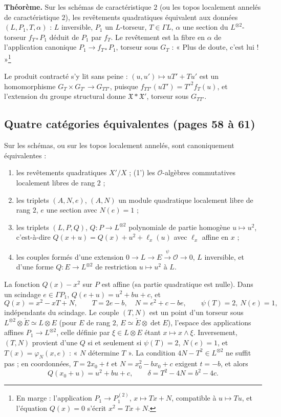 \documentclass[11pt,a4paper]{article}
\begin{document}
\textbf{Théorème.} Sur les schémas de caractéristique $2$ (ou les topos localement
annelés de caractéristique $2$), les revêtements quadratiques équivalent aux
données $(L, P_1, T, \alpha)$ : $L$ inversible, $P_1$ un $L$-torseur, $T \in \Gamma L$,
$\alpha$ une section du $L^{\otimes 2}$-torseur $f_{T*}P_1$ déduit de $P_1$ par $f_T$.
Le revêtement est la fibre en $\alpha$ de l'application canonique
$P_1 \to f_{T*}P_1$, torseur sous $G_T$ : « Plus de doute, c'est lui ! »\footnote{En
marge : l'application $P_1 \to P_1^{(2)}$, $x \mapsto Tx + N$, compatible à $u \mapsto
Tu$, et l'équation $Q(x) = 0$ s'écrit $x^{2} = Tx + N$.}

Le produit contracté s'y lit sans peine : $(u, u') \mapsto uT' + Tu'$ est un
homomorphisme $G_T \times G_{T'} \to G_{TT'}$, puisque $f_{TT'}(uT') = T'^{2}f_T(u)$, et
l'extension du groupe structural donne $\mathfrak{X} * \mathfrak{X}'$, torseur sous
$G_{TT'}$.

\subsection*{Quatre catégories équivalentes (pages 58 à 61)}

Sur les schémas, ou sur les topos localement annelés, sont canoniquement
équivalentes :
\begin{enumerate}
\item[(1)] les revêtements quadratiques $X'/X$ ; (1') les $\mathcal{O}$-algèbres
commutatives localement libres de rang $2$ ;
\item[(2)] les triplets $(A, N, e)$, $(A, N)$ un module quadratique localement libre de
rang $2$, $e$ une section avec $N(e) = 1$ ;
\item[(3)] les triplets $(L, P, Q)$, $Q : P \to L^{\otimes 2}$ polynomiale de partie
homogène $u \mapsto u^{2}$, c'est-à-dire $Q(x + u) = Q(x) + u^{2} + \ell_x(u)$ avec
$\ell_x$ affine en $x$ ;
\item[(3')] les couples formés d'une extension $0 \to L \to E \xrightarrow{\psi}
\mathcal{O} \to 0$, $L$ inversible, et d'une forme $Q : E \to L^{\otimes 2}$ de
restriction $u \mapsto u^{2}$ à $L$.
\end{enumerate}
La fonction $Q(x) - x^{2}$ sur $P$ est affine (sa partie quadratique est nulle).
Dans un scindage $e \in \Gamma P_1$, $Q(e + u) = u^{2} + bu + c$, et
\[
  Q(x) = x^{2} - xT + N, \qquad \boxed{T = 2e - b, \quad N = e^{2} + c - be}, \qquad \psi(T) = 2,\ N(e) = 1,
\]
indépendants du scindage. Le couple $(T, N)$ est un point d'un torseur sous
$L^{\otimes 2} \otimes \check{E} \simeq L \otimes E$ (pour $E$ de rang $2$,
$E \simeq \check{E} \otimes \det E$), l'espace des applications affines $P_1 \to
L^{\otimes 2}$, celle définie par $\xi \in L \otimes E$ étant $x \mapsto x \wedge \xi$.
Inversement, $(T, N)$ provient d'une $Q$ si et seulement si $\psi(T) = 2$, $N(e) = 1$, et
$T(x) = \varphi_N(x, e)$ : « $N$ détermine $T$ ». La condition $4N - T^{2} \in
L^{\otimes 2}$ ne suffit pas ; en coordonnées, $T = 2x_0 + t$ et $N = x_0^{2} - bx_0 + c$
exigent $t = -b$, et alors
\[
  Q(x_0 + u) = u^{2} + bu + c, \qquad \delta = T^{2} - 4N = b^{2} - 4c .
\]
\end{document}
